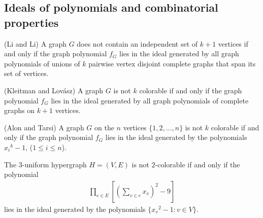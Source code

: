 \subsection{Ideals of polynomials and combinatorial properties}
\begin{theorem}
	(Li and Li) A graph $G$ does not contain an independent set of $k + 1$ vertices if and only if the graph polynomial $f_G$ lies in the ideal generated by all graph polynomials of unions of $k$ pairwise vertex disjoint complete graphs that span its set of vertices.
\end{theorem}
\begin{theorem}
	(Kleitman and Lovász) A graph $G$ is not $k$ colorable if and only if the graph polynomial $f_G$ lies in the ideal generated by all graph polynomials of complete graphs on $k + 1$ vertices.
\end{theorem}
\begin{theorem}
	(Alon and Tarsi) A graph $G$ on the $n$ vertices $\{1, 2, \ldots, n\}$ is not $k$ colorable if and only if the graph polynomial $f_G$ lies in the ideal generated by the polynomials ${x_i}^k-1$, ($1 \leq i \leq n$).
\end{theorem}
\begin{theorem}
	The $3$-uniform hypergraph $H = (V, E)$ is not $2$-colorable if and only if the polynomial
	\begin{align*}
		\prod_{e \in E}[(\sum_{v \in e}x_v)^2 - 9]
	\end{align*}
	lies in the ideal generated by the polynomials $\{ {x_v}^2 − 1 : v \in V \}$.
\end{theorem}